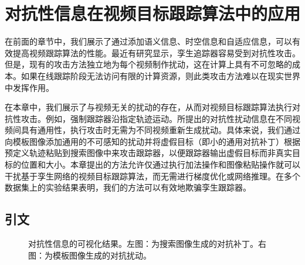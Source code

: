 \chapter{对抗性信息在视频目标跟踪算法中的应用} \label{chap:attack}
在前面的章节中，我们展示了通过添加语义信息、时空信息和自适应信息，可以有效提高视频跟踪算法的性能。最近有研究显示，孪生追踪器容易受到对抗性攻击。但是，现有的攻击方法独立地为每个视频制作扰动，这在计算上具有不可忽略的成本。如果在线跟踪阶段无法访问有限的计算资源，则此类攻击方法难以在现实世界中发挥作用。

在本章中，我们展示了与视频无关的扰动的存在，从而对视频目标跟踪算法执行对抗性攻击。例如，强制跟踪器沿指定轨迹运动。所提出的对抗性扰动信息在不同视频间具有通用性，执行攻击时无需为不同视频重新生成扰动。具体来说，我们通过向模板图像添加通用的不可感知的扰动并将虚假目标（即小的通用对抗补丁）根据预定义轨迹粘贴到搜索图像中来攻击跟踪器，以便跟踪器输出虚假目标而非真实目标的位置和大小。本章提出的方法允许仅通过执行加法操作和图像粘贴操作就可以干扰基于孪生网络的视频目标跟踪算法，而无需进行梯度优化或网络推理。在多个数据集上的实验结果表明，我们的方法可以有效地欺骗孪生跟踪器。

\section{引文}

\begin{figure}[t]
\centering
{} \qquad \qquad 
{}
\caption{对抗性信息的可视化结果。左图：为搜索图像生成的对抗补丁。右图：为模板图像生成的对抗扰动。}
\end{figure}

